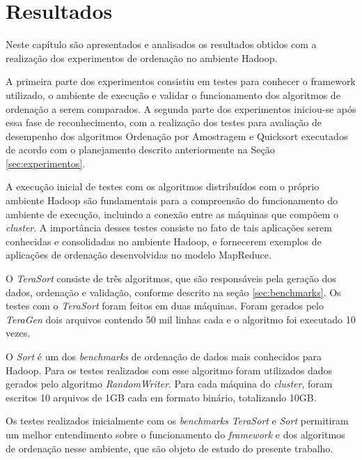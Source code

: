 %
%

\chapter{Resultados}
\label{cap:resultados}

Neste capítulo são apresentados e analisados os resultados obtidos com a realização dos experimentos de ordenação no ambiente Hadoop.

A primeira parte dos experimentos consistiu em testes para conhecer o framework utilizado, o ambiente de execução e validar o funcionamento dos algoritmos de ordenação a serem comparados. A segunda parte dos experimentos iniciou-se após essa fase de reconhecimento, com a realização dos testes para avaliação de desempenho dos algoritmos Ordenação por Amostragem e Quicksort executados de acordo com o planejamento descrito anteriormente na Seção \ref{sec:experimentos}. 



A execução inicial de testes com os algoritmos distribuídos com o próprio ambiente Hadoop são fundamentais para a compreensão do funcionamento do ambiente de execução, incluindo a conexão entre as máquinas que compõem o \textit{cluster}.  
A importância desses testes consiste no fato de tais  aplicações serem conhecidas e consolidadas no ambiente Hadoop, e fornecerem exemplos de aplicações de ordenação desenvolvidas no modelo MapReduce.

O \textit{TeraSort} consiste de três algoritmos, que são responsáveis pela geração dos dados, ordenação e validação, conforme descrito na seção \ref{sec:benchmarks}.
Os testes com o \textit{TeraSort} foram feitos em duas máquinas. Foram gerados pelo \textit{TeraGen} dois arquivos contendo 50 mil linhas cada e o algoritmo foi executado 10 vezes.

O \textit{Sort} é um dos \textit{benchmarks}  de ordenação de dados mais conhecidos para Hadoop. Para os testes realizados com esse algoritmo foram utilizados dados gerados pelo algoritmo \textit{RandomWriter}. Para cada máquina do \textit{cluster}, foram escritos 10 arquivos de 1GB cada em formato binário, totalizando 10GB.

Os testes realizados inicialmente com os \textit{benchmarks} \textit{TeraSort} e \textit{Sort} permitiram um melhor entendimento sobre o funcionamento do \textit{framework} e dos algoritmos de ordenação nesse ambiente, que são objeto de estudo do presente trabalho. 

